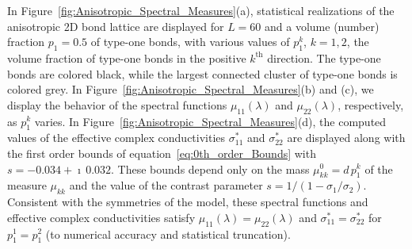 \documentclass{cmslatex}
\begin{document}
In Figure~\ref{fig:Anisotropic_Spectral_Measures}(a), statistical  
realizations of the anisotropic 2D bond lattice are displayed for
$L=60$ and a volume (number) fraction $p_1=0.5$ of type-one bonds,
with various values of $p_1^k$, $k=1,2$, the volume fraction of
type-one bonds in the positive $k^{\text{th}}$ direction. The type-one
bonds are colored black, while the largest connected cluster of
type-one bonds is colored grey. In
Figure~\ref{fig:Anisotropic_Spectral_Measures}(b) and (c), we display
the behavior of the spectral functions $\mu_{11}(\lambda)$ and $\mu_{22}(\lambda)$,
respectively, as $p_1^k$ varies. In
Figure~\ref{fig:Anisotropic_Spectral_Measures}(d), the computed values
of the effective complex conductivities $\sigma^*_{11}$ and $\sigma^*_{22}$
are displayed along with the first order bounds of
equation~\eqref{eq:0th_order_Bounds} with $s=-0.034+\imath\,0.032$. These 
bounds depend only on the mass $\mu^0_{kk}=d\,p_1^k$ of the measure
$\mu_{kk}$ and the value of the contrast parameter
$s=1/(1-\sigma_1/\sigma_2)$. Consistent with the symmetries of the
model, these spectral functions and effective complex conductivities 
satisfy $\mu_{11}(\lambda)=\mu_{22}(\lambda)$ and
$\sigma^*_{11}=\sigma^*_{22}$ for $p_1^1=p_1^2$ (to numerical accuracy
and statistical truncation). 
\end{document}
